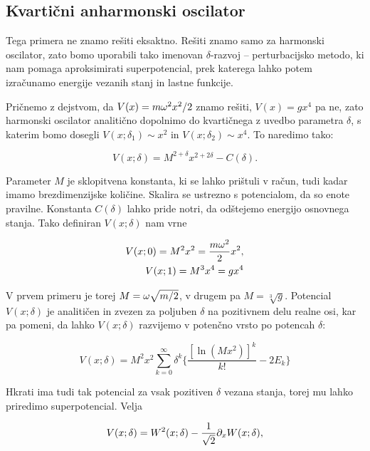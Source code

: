 \subsection{Kvarti\v cni anharmonski oscilator}

Tega primera ne znamo re\v siti eksaktno. Re\v siti znamo samo za harmonski oscilator, zato bomo uporabili tako imenovan 
$\delta$-razvoj -- perturbacijsko metodo, ki nam pomaga aproksimirati superpotencial, prek katerega lahko potem izra\v cunamo
energije vezanih stanj in lastne funkcije.

Pri\v cnemo z dejstvom, da $V(x) = m\omega^2 x^2/2$ znamo re\v siti, $V(x) = gx^4$ pa ne, zato harmonski oscilator
analiti\v cno dopolnimo do kvarti\v cnega z uvedbo parametra $\delta$, s katerim bomo dosegli $V(x;\delta_1) \sim x^2$
in $V(x;\delta_2) \sim x^4$. To naredimo tako:

\begin{equation}
	V(x;\delta) = M^{2 + \delta} x^{2 + 2\delta} - C(\delta).
	\label{anal-delta}
\end{equation}

\ni Parameter $M$ je sklopitvena konstanta, ki se lahko pri\v stuli v ra\v cun, tudi kadar imamo brezdimenzijske koli\v cine.
Skalira se ustrezno s potencialom, da so enote pravilne. Konstanta $C(\delta)$ lahko pride notri, da od\v stejemo energijo
osnovnega stanja. Tako definiran $V(x;\delta)$ nam vrne

\begin{align}
	V(x; 0) = M^2 x^2 = \frac{m\omega^2}{2} x^2, \\
	V(x; 1) = M^3 x^4 = g x^4
\end{align}

\ni V prvem primeru je torej $M = \omega\sqrt{m/2}$, v drugem pa $M = \sqrt[3]{g}$. Potencial $V(x;\delta)$ je analiti\v cen in
zvezen za poljuben $\delta$ na pozitivnem delu realne osi, kar pa pomeni, da lahko $V(x;\delta)$ razvijemo v poten\v cno
vrsto po potencah $\delta$:

\begin{equation}
	V(x;\delta) = M^2x^2\sum_{k = 0}^{\infty} \delta^k \bigg\{\frac{[\ln(Mx^2)]^k}{k!} - 2E_k\bigg\}
	\label{prvi}
\end{equation}

\ni Hkrati ima tudi tak potencial za vsak pozitiven $\delta$ vezana stanja, torej mu lahko priredimo superpotencial. Velja

\begin{equation}
	V(x;\delta) = W^2(x;\delta) - \frac{1}{\sqrt{2}}\partial_x W(x;\delta),
	\label{tretji}
\end{equation}

